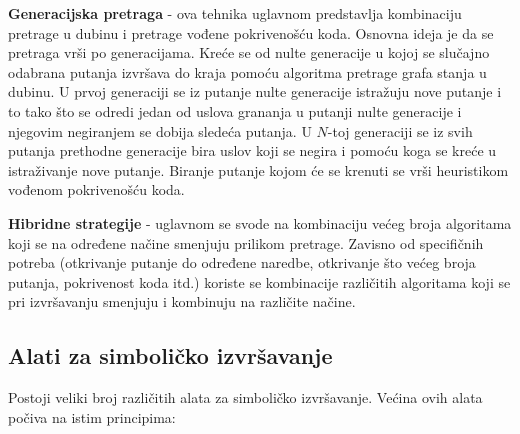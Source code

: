\documentclass[12pt]{article}
\begin{document}
\textbf{Generacijska pretraga} - ova tehnika uglavnom predstavlja kombinaciju pretrage u dubinu i pretrage vođene pokrivenošću koda. Osnovna ideja je da se pretraga vrši po generacijama. Kreće se od nulte generacije u kojoj se slučajno odabrana putanja izvršava do kraja pomoću algoritma pretrage grafa stanja u dubinu. U prvoj generaciji se iz putanje nulte generacije istražuju nove putanje i to tako što se odredi jedan od uslova grananja u putanji nulte generacije i njegovim negiranjem se dobija sledeća putanja. U $N$-toj generaciji se iz svih putanja prethodne generacije bira uslov koji se negira i pomoću koga se kreće u istraživanje nove putanje. Biranje putanje kojom će se krenuti se vrši heuristikom vođenom pokrivenošću koda.
\bigskip

\textbf{Hibridne strategije} - uglavnom se svode na kombinaciju većeg broja algoritama koji se na određene načine smenjuju prilikom pretrage. Zavisno od specifičnih potreba (otkrivanje putanje do određene naredbe, otkrivanje što većeg broja putanja, pokrivenost koda itd.) koriste se kombinacije različitih algoritama koji se pri izvršavanju smenjuju i kombinuju na različite načine.

\subsection{Alati za simboličko izvršavanje}

Postoji veliki broj različitih alata za simboličko izvršavanje. Većina ovih alata počiva na istim principima:
\end{document}
